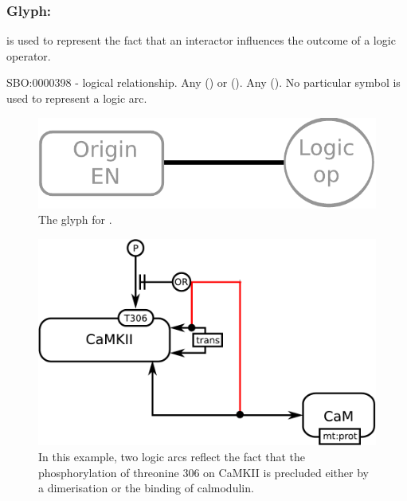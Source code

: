 \subsubsection{Glyph:  }\label{sec:logicArc}

 is used to represent the fact that an interactor influences
the outcome of a logic operator. 

\begin{glyphDescription}
 \glyphSboTerm SBO:0000398 - logical relationship.
 \glyphOrigin Any  () or  ().
 \glyphTarget Any  ().
 \glyphEndPoint No particular symbol is used to represent a logic arc.
 \end{glyphDescription}

\begin{figure}[H]
  \centering
  \includegraphics[scale = 0.4]{images/logicArc}
  \caption{The \ER glyph for .}
  \label{fig:logicArc}
\end{figure}

\begin{figure}[H]
  \centering
  \includegraphics[scale = 0.5]{examples/ex-logicArc}
  \caption{In this example, two logic arcs reflect the fact that the phosphorylation of threonine 306 on CaMKII is precluded either by a dimerisation or the binding of calmodulin.}
  \label{fig:ex-logicArc}
\end{figure}

